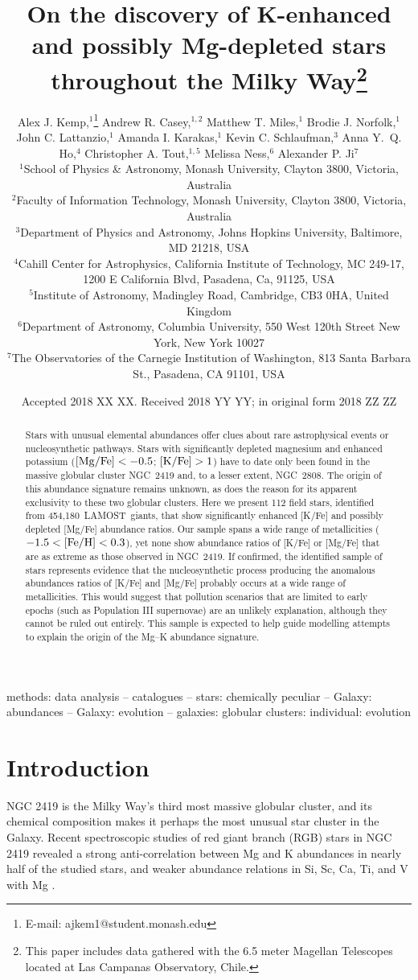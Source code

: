 \documentclass[a4paper,fleqn,usenatbib]{mnras}
\title[Mg--K stars in LAMOST]{On the discovery of K-enhanced and possibly Mg-depleted stars throughout the Milky Way\footnote{This paper includes data gathered with the 6.5 meter Magellan Telescopes located at Las Campanas Observatory, Chile.}}
\author[Kemp et al.]{Alex J. Kemp,$^{1}$\thanks{E-mail: ajkem1@student.monash.edu}
Andrew R. Casey,$^{1,2}$
Matthew T. Miles,$^{1}$
Brodie J. Norfolk,$^{1}$\newauthor
John C. Lattanzio,$^{1}$
Amanda I. Karakas,$^{1}$
Kevin C. Schlaufman,$^{3}$
Anna Y.~Q. Ho,$^{4}$\newauthor
Christopher A. Tout,$^{1,5}$
Melissa Ness,$^{6}$
Alexander P. Ji$^{7}$
\\
$^{1}$School of Physics \& Astronomy, Monash University, Clayton 3800, Victoria, Australia\\
$^{2}$Faculty of Information Technology, Monash University, Clayton 3800, Victoria, Australia\\
$^{3}$Department of Physics and Astronomy, Johns Hopkins University, Baltimore, MD 21218, USA\\
$^{4}$Cahill Center for Astrophysics, California Institute of Technology, MC 249-17, 1200 E California Blvd, Pasadena, Ca, 91125, USA\\
$^{5}$Institute of Astronomy, Madingley Road, Cambridge, CB3 0HA, United Kingdom\\
$^{6}$Department of Astronomy, Columbia University, 550 West 120th Street New York, New York 10027\\
$^{7}$The Observatories of the Carnegie Institution of Washington, 813 Santa Barbara St., Pasadena, CA 91101, USA
}
\date{Accepted 2018 XX XX. Received 2018 YY YY; in original form 2018 ZZ ZZ}
\newcommand{\LamostGiants}{454,180}
\newcommand{\project}[1]{#1}
\newcommand{\lamost}{\project{LAMOST}}
\let\ACMmaketitle=\maketitle
\renewcommand{\maketitle}{\begingroup\let\footnote=\thanks \ACMmaketitle\endgroup}
\begin{document}
\label{firstpage}
\pagerange{\pageref{firstpage}--\pageref{lastpage}}
\maketitle


\begin{abstract}
Stars with unusual elemental abundances offer clues about rare astrophysical events or nucleosynthetic pathways. Stars with significantly depleted magnesium and enhanced potassium ($[{\rm Mg}/{\rm Fe}] < -0.5$; $[{\rm K}/{\rm Fe}] > 1$) have to date only been found in the massive globular cluster NGC~2419 and, to a lesser extent, NGC~2808. The origin of this abundance signature remains unknown, as does the reason for its apparent exclusivity to these two globular clusters. Here we present 112 field stars, identified from \LamostGiants\ \lamost\ giants, that show significantly enhanced [K/Fe] and possibly depleted [Mg/Fe] abundance ratios.
Our sample spans a wide range of metallicities ($-1.5 < [{\rm Fe}/{\rm H}] < 0.3$), yet none show abundance ratios of [K/Fe] or [Mg/Fe] that are as extreme as those observed in NGC~2419. 
If confirmed, the identified sample of stars represents evidence that the nucleosynthetic process producing the anomalous abundances ratios of [K/Fe] and [Mg/Fe] probably occurs at a wide range of metallicities. This would suggest that pollution scenarios that are limited to early epochs (such as Population III supernovae) are an unlikely explanation, although they cannot be ruled out entirely. This sample is expected to help guide modelling attempts to explain the origin of the Mg--K abundance signature.
\end{abstract}

\begin{keywords}
methods: data analysis -- catalogues -- stars: chemically peculiar -- Galaxy: abundances -- Galaxy: evolution -- galaxies: globular clusters: individual: evolution
\end{keywords}



\section{Introduction}
\label{sec:intro}
NGC 2419 is the Milky Way's third most massive globular cluster, and its chemical composition makes it perhaps the most unusual star cluster in the Galaxy. Recent spectroscopic studies of red giant branch (RGB) stars in NGC 2419 revealed a strong anti-correlation between Mg and K abundances in nearly half of the studied stars, and weaker abundance relations in Si, Sc, Ca, Ti, and V with Mg \citep{mucciarelli2012,cohenkirby2012}.
\end{document}

